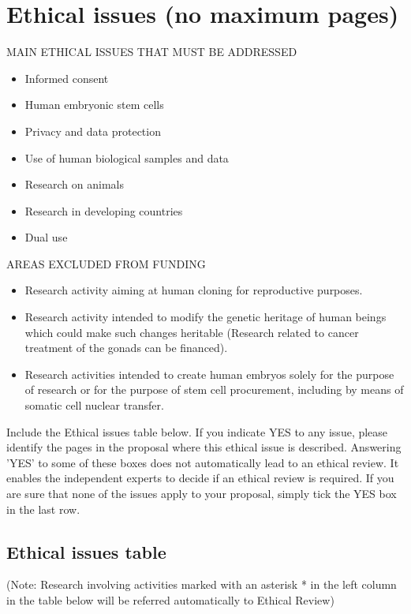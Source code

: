 \documentclass[a4paper,11pt]{article}
\begin{document}
\section{Ethical issues  (no maximum pages)}

MAIN ETHICAL ISSUES THAT MUST BE ADDRESSED
\begin{itemize}
\item Informed consent
\item Human embryonic stem cells
\item Privacy and data protection
\item Use of human biological samples and data
\item Research on animals
\item Research in developing countries
\item Dual use
\end{itemize}

AREAS EXCLUDED FROM FUNDING
\begin{itemize}
\item Research activity aiming at human cloning for reproductive
  purposes.
\item Research activity intended to modify the genetic heritage of
  human beings which could make such changes heritable (Research
  related to cancer treatment of the gonads can be financed).
\item Research activities intended to create human embryos solely for
  the purpose of research or for the purpose of stem cell procurement,
  including by means of somatic cell nuclear transfer.
\end{itemize}

Include the Ethical issues table below. If you indicate YES to any
issue, please identify the pages in the proposal where this ethical
issue is described. Answering 'YES' to some of these boxes does not
automatically lead to an ethical review. It enables the independent
experts to decide if an ethical review is required. If you are sure
that none of the issues apply to your proposal, simply tick the YES
box in the last row.

\clearpage

\subsection{Ethical issues table}

(Note: Research involving activities marked with an asterisk * in the
left column in the table below will be referred automatically to
Ethical Review)
\end{document}
